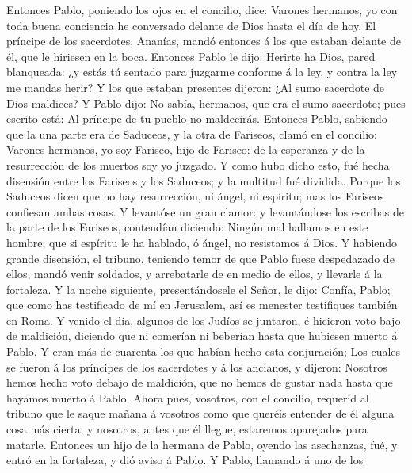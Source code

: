  Entonces Pablo, poniendo los ojos en el concilio, dice:
Varones hermanos, yo con toda buena conciencia he conversado delante de
Dios hasta el día de hoy.  El príncipe de los sacerdotes,
Ananías, mandó entonces á los que estaban delante de él, que le hiriesen
en la boca.  Entonces Pablo le dijo: Herirte ha Dios,
pared blanqueada: ¿y estás tú sentado para juzgarme conforme á la ley, y
contra la ley me mandas herir?  Y los que estaban
presentes dijeron: ¿Al sumo sacerdote de Dios maldices?  Y
Pablo dijo: No sabía, hermanos, que era el sumo sacerdote; pues escrito
está: Al príncipe de tu pueblo no maldecirás.  Entonces
Pablo, sabiendo que la una parte era de Saduceos, y la otra de Fariseos,
clamó en el concilio: Varones hermanos, yo soy Fariseo, hijo de Fariseo:
de la esperanza y de la resurrección de los muertos soy yo juzgado.
 Y como hubo dicho esto, fué hecha disensión entre los
Fariseos y los Saduceos; y la multitud fué dividida. 
Porque los Saduceos dicen que no hay resurrección, ni ángel, ni
espíritu; mas los Fariseos confiesan ambas cosas.  Y
levantóse un gran clamor: y levantándose los escribas de la parte de los
Fariseos, contendían diciendo: Ningún mal hallamos en este hombre; que
si espíritu le ha hablado, ó ángel, no resistamos á Dios.
 Y habiendo grande disensión, el tribuno, teniendo temor
de que Pablo fuese despedazado de ellos, mandó venir soldados, y
arrebatarle de en medio de ellos, y llevarle á la fortaleza.
 Y la noche siguiente, presentándosele el Señor, le dijo:
Confía, Pablo; que como has testificado de mí en Jerusalem, así es
menester testifiques también en Roma.  Y venido el día,
algunos de los Judíos se juntaron, é hicieron voto bajo de maldición,
diciendo que ni comerían ni beberían hasta que hubiesen muerto á Pablo.
 Y eran más de cuarenta los que habían hecho esta
conjuración;  Los cuales se fueron á los príncipes de los
sacerdotes y á los ancianos, y dijeron: Nosotros hemos hecho voto debajo
de maldición, que no hemos de gustar nada hasta que hayamos muerto á
Pablo.  Ahora pues, vosotros, con el concilio, requerid
al tribuno que le saque mañana á vosotros como que queréis entender de
él alguna cosa más cierta; y nosotros, antes que él llegue, estaremos
aparejados para matarle.  Entonces un hijo de la hermana
de Pablo, oyendo las asechanzas, fué, y entró en la fortaleza, y dió
aviso á Pablo.  Y Pablo, llamando á uno de los

